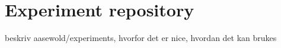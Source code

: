 \section{Experiment repository}

beskriv aasewold/experiments, hvorfor det er nice, hvordan det kan brukes


